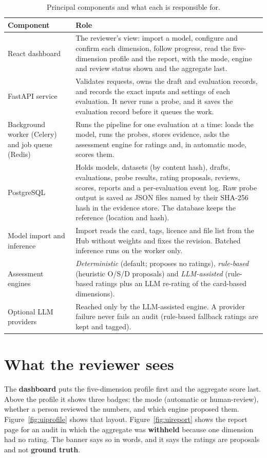 \begin{table}[!htbp]
\centering\small
\caption{Principal components and what each is responsible for.}\label{tab:comp}
\begin{tabularx}{\textwidth}{|>{\raggedright\arraybackslash}p{3.3cm}|L|}
\hline
\textbf{Component} & \textbf{Role}\\
\hline
React dashboard & The reviewer's view: import a model, configure and confirm each dimension, follow progress, read the five-dimension profile and the report, with the mode, engine and review status shown and the aggregate last.\\ \hline
FastAPI service & Validates requests, owns the draft and evaluation records, and records the exact inputs and settings of each evaluation. It never runs a probe, and it saves the evaluation record before it queues the work.\\ \hline
Background worker (Celery) and job queue (Redis) & Runs the pipeline for one evaluation at a time: loads the model, runs the probes, stores evidence, asks the assessment engine for ratings and, in automatic mode, scores them.\\ \hline
PostgreSQL & Holds models, datasets (by content hash), drafts, evaluations, probe results, rating proposals, reviews, scores, reports and a per-evaluation event log. Raw probe output is saved as JSON files named by their SHA-256 hash in the evidence store. The database keeps the reference (location and hash).\\ \hline
Model import and inference & Import reads the card, tags, licence and file list from the Hub without weights and fixes the revision. Batched  inference \cite{wolf2020} runs on the worker only.\\ \hline
Assessment engines & \emph{Deterministic} (default; proposes no ratings), \emph{rule-based} (heuristic O/S/D proposals) and \emph{LLM-assisted} (rule-based ratings plus an LLM re-rating of the card-based dimensions).\\ \hline
Optional LLM providers & Reached only by the LLM-assisted engine. A provider failure never fails an audit (rule-based fallback ratings are kept and tagged).\\
\hline
\end{tabularx}
\end{table}

\section{What the reviewer sees}
The \textbf{dashboard} puts the five-dimension profile first and the aggregate score last. Above the profile it shows three badges: the mode (automatic or human-review), whether a person reviewed the numbers, and which engine proposed them. Figure~\ref{fig:uiprofile} shows that layout. Figure~\ref{fig:uireport} shows the report page for an audit in which the aggregate was \textbf{withheld} because one dimension had no rating. The banner says so in words, and it says the ratings are proposals and not \textbf{ground truth}.

